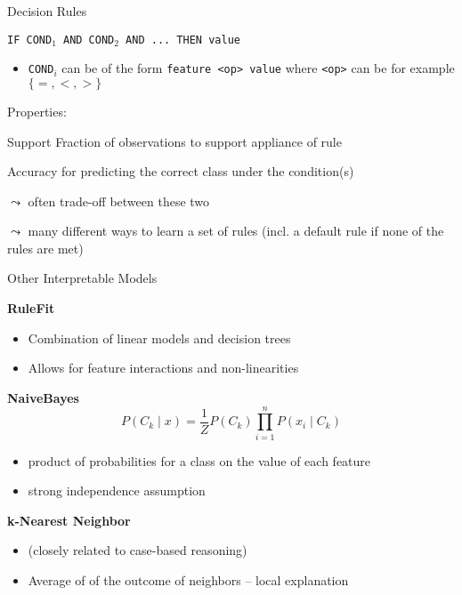 \documentclass[aspectratio=169]{../latex_main/tntbeamer}  %
\begin{document}

\begin{frame}[c]{Decision Rules}

\texttt{IF COND$_1$ AND COND$_2$ AND ... THEN value}

\begin{itemize}
    \item \texttt{COND$_i$} can be of the form \texttt{feature <op> value} where \texttt{<op>} can be for example $\{=, <, > \}$
\end{itemize}

\pause
\medskip

Properties:
\begin{description}
    \item{Support} Fraction of observations to support appliance of rule
    \item{Accuracy} for predicting the correct class under the condition(s)
\end{description}

$\leadsto$ often trade-off between these two

\pause
\medskip

$\leadsto$ many different ways to learn a set of rules (incl. a default rule if none of the rules are met)

\end{frame}


\begin{frame}[c]{Other Interpretable Models}

\textbf{RuleFit} 
\begin{itemize}
    \item Combination of linear models and decision trees 
    \item Allows for feature interactions and non-linearities
\end{itemize}

\textbf{NaiveBayes}
$$P (C_k \mid x ) = \frac{1}{Z} P(C_k) \prod_{i=1}^{n} P(x_i \mid C_k) $$
\begin{itemize}
    \item product of probabilities for a class on the value of each feature
    \item strong independence assumption
\end{itemize}


\textbf{k-Nearest Neighbor}
\begin{itemize}
    \item (closely related to case-based reasoning)
    \item Average of of the outcome of neighbors -- local explanation
\end{itemize}

\end{frame}
	
\end{document}
